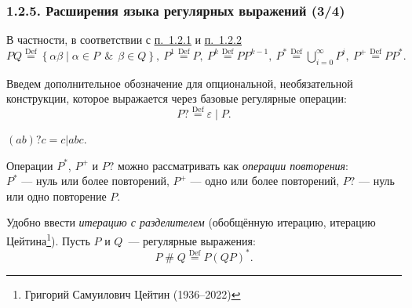 \documentclass[mathserif,12pt,aspectratio=169]{beamer}
\renewcommand{\index}[1]{}
\def\odmkey#1#2{{\it\color{red} #1}\index{#2}}
\def\Set#1#2{\left\{ #1 \mid #2 \right\}}
\def\Def{\stackrel{\text{Def}}{=}}
\def\And{\operatorname{\,\&\,}}
\def\DMref#1#2{{\color{blue}\underline{\hyperlink{#2}{#1}}}}
\begin{document}
\begin{frame}
\frametitle{1.2.5. Расширения языка регулярных выражений (3/4)}
В частности, в соответствии с \DMref{п.~1.2.1}{1.2.1.} и \DMref{п.~1.2.2}{1.2.2.}\\
$ 
PQ \Def\Set{\alpha\beta}{\alpha\in P \And \beta\in Q}, \
P^1\Def P, \ 
P^k\Def PP^{k-1},\  
P^*\Def\bigcup_{i=0}^{\infty}P^i,\ P^+\Def PP^* .$

Введем дополнительное обозначение для опциональной, необязательной конструкции, которое  выражается через базовые регулярные операции:
$$
P? \Def \varepsilon \mid P.
$$

\begin{example}
$(ab)?c = c|abc.
$
\end{example}

\begin{remark}
Операции $P^*$, $P^+$ и $P?$ можно рассматривать как
\odmkey{операции повторения}{Операция!повторения}:\\
$P^*$ --- нуль или более повторений,
$P^+$ --- одно или более повторений,
$P?$ --- нуль или одно повторение $P$.
\end{remark}

Удобно ввести \odmkey{итерацию с разделителем}{Итерация!с разделителем}
(обобщённую итерацию, итерацию Цейтина\footnote{Григорий Самуилович Цейтин (1936--2022)}).
Пусть $P$ и $Q$~--- регулярные выражения:
$$
P \operatorname{\#} Q \Def P(QP)^*.
$$

\end{frame}
\end{document}
